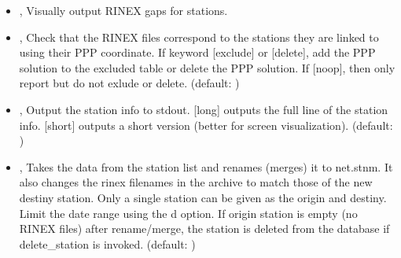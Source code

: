 \documentclass[letterpaper,10pt,english]{sphinxmanual}
\begin{document}
\begin{itemize}
\item {} 
\sphinxAtStartPar
{\hyperref[\detokenize{pgamit.com:IntegrityCheck.py--gg}]{}}, {\hyperref[\detokenize{pgamit.com:IntegrityCheck.py---graphical_gaps}]{}} \sphinxhyphen{} Visually output RINEX gaps for stations.

\item {} 
\sphinxAtStartPar
{\hyperref[\detokenize{pgamit.com:IntegrityCheck.py--sc}]{}} , {\hyperref[\detokenize{pgamit.com:IntegrityCheck.py---spatial_coherence}]{}}  \sphinxhyphen{} Check that the RINEX files correspond to the stations they are linked to using their PPP coordinate. If keyword {[}exclude{]} or {[}delete{]}, add the PPP solution to the excluded table or delete the PPP solution. If {[}noop{]}, then only report but do not exlude or delete. (default: )

\item {} 
\sphinxAtStartPar
{\hyperref[\detokenize{pgamit.com:IntegrityCheck.py--print}]{}} , {\hyperref[\detokenize{pgamit.com:IntegrityCheck.py---print_stninfo}]{}}  \sphinxhyphen{} Output the station info to stdout. {[}long{]} outputs the full line of the station info. {[}short{]} outputs a short version (better for screen visualization). (default: )

\item {} 
\sphinxAtStartPar
{\hyperref[\detokenize{pgamit.com:IntegrityCheck.py--r}]{}} , {\hyperref[\detokenize{pgamit.com:IntegrityCheck.py---rename}]{}}  \sphinxhyphen{} Takes the data from the station list and renames (merges) it to net.stnm. It also changes the rinex filenames in the archive to match those of the new destiny station. Only a single station can be given as the origin and destiny. Limit the date range using the \sphinxhyphen{}d option. If origin station is empty (no RINEX files) after rename/merge, the station is deleted from the database if \textendash{}delete\_station is invoked. (default: )


\end{itemize}
\end{document}
